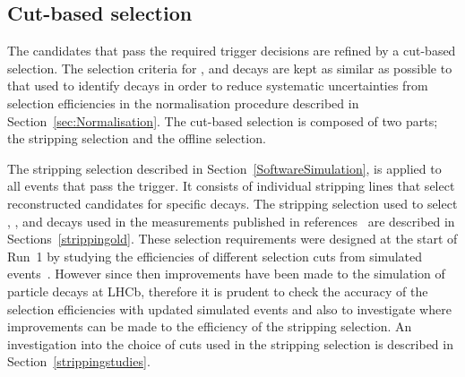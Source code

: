
\subsection{Cut-based selection}
\label{sec:cutbasedsel}
The \bmumu candidates that pass the required trigger decisions are refined by a cut-based selection. %
The selection criteria for \bhh, \bujpsik and \bsjpsiphi decays are kept as similar as possible to that used to identify \bmumu decays in order to reduce systematic uncertainties from selection efficiencies in the normalisation procedure described in Section~\ref{sec:Normalisation}. 
The cut-based selection is composed of two parts; the stripping selection and the offline selection. 

The stripping selection described in Section~\ref{SoftwareSimulation}, is applied to all events that pass the trigger. It consists of individual stripping lines that select reconstructed candidates for specific decays. The stripping selection used to select \bmumu, \bhh, \bujpsik and \bsjpsiphi decays used in the \BF measurements published in references~\cite{Aaij:2013aka,CMS:2014xfa} are described in Sections~\ref{strippingold}.
These selection requirements were designed at the start of Run~1 by studying the efficiencies of different selection cuts from simulated events~\cite{Diego}. However since then improvements have been made to the simulation of particle decays at LHCb, therefore it is prudent to check the accuracy of the selection efficiencies with updated simulated events and also to investigate where improvements can be made to the efficiency of the \bmumu stripping selection. %
An investigation into the choice of cuts used in the stripping selection is described in Section~\ref{strippingstudies}. 

